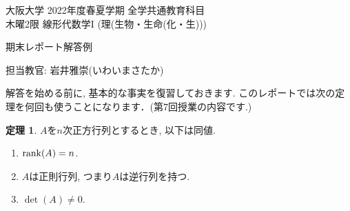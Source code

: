 \documentclass[dvipdfmx,a4paper,11pt]{article}
\theoremstyle{definition}
\newtheorem{thm}{定理}
\begin{document}
\begin{center}
{ \large 大阪大学 2022年度春夏学期 全学共通教育科目 \\ 木曜2限 線形代数学I (理(生物・生命(化・生)))} \\
\vspace{5pt}

{\LARGE 期末レポート解答例 } \\
\vspace{5pt}

\end{center}

\begin{flushright}
 担当教官: 岩井雅崇(いわいまさたか) 
\end{flushright} 

解答を始める前に, 基本的な事実を復習しておきます.
 このレポートでは次の定理を何回も使うことになります．(第7回授業の内容です.)
 
 \begin{tcolorbox}[
    colback = white,
    colframe = green!35!black,
    fonttitle = \bfseries,
    breakable = true]
    \begin{thm}
    \label{determinant}
    $A$を$n$次正方行列とするとき, 以下は同値.
\begin{enumerate}
\item $\rank (A) =n$.
\item $A$は正則行列, つまり$A$は逆行列を持つ.
\item $\det(A)\neq 0$.
\end{enumerate}
  \end{thm}
 \end{tcolorbox}
 
\end{document}
